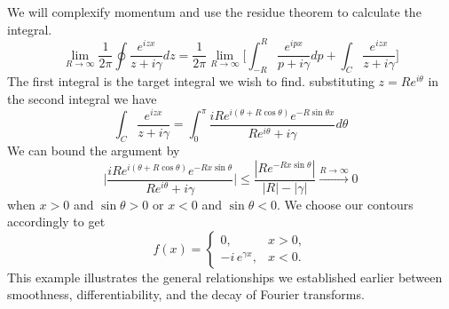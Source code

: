 \documentclass[11pt,a4paper]{article}
\begin{document}
We will complexify momentum and use the residue theorem to calculate the integral.
$$
\lim_{R\to\infty}\frac{1}{2\pi}\oint \frac{e^{izx}}{z+i\gamma}dz = \frac{1}{2\pi}\lim_{R\to\infty}\big[\int_{-R}^{R}\frac{e^{ipx}}{p+i\gamma}dp + \int_{C}\frac{e^{izx}}{z+i\gamma}\big]
$$
The first integral is the target integral we wish to find. substituting $z = Re^{i\theta}$ in the second integral we have
$$
\int_{C}\frac{e^{izx}}{z+i\gamma} = \int_{0}^{\pi}\frac{iRe^{i(\theta+R\cos{\theta})}e^{-R\sin{\theta}x}}{Re^{i\theta}+i\gamma}d\theta
$$
We can bound the argument by 
$$
\Big|\frac{iRe^{i(\theta+R\cos{\theta})}e^{-Rx\sin{\theta}}}{Re^{i\theta}+i\gamma}\Big|\leq \frac{|Re^{-Rx\sin{\theta}}|}{|R|-|\gamma|}  \xrightarrow{R\to\infty} 0
$$
when $x>0$ and $\sin\theta > 0$ or $x<0$ and $\sin\theta < 0$. We choose our contours accordingly to get 
\[
f(x) =
\begin{cases}
	0, & x > 0, \\[6pt]
	-i\,e^{\gamma x}, & x < 0.
\end{cases}
\] 
This example illustrates the general relationships we established earlier between smoothness, differentiability, and the decay of Fourier transforms.
\end{document}
